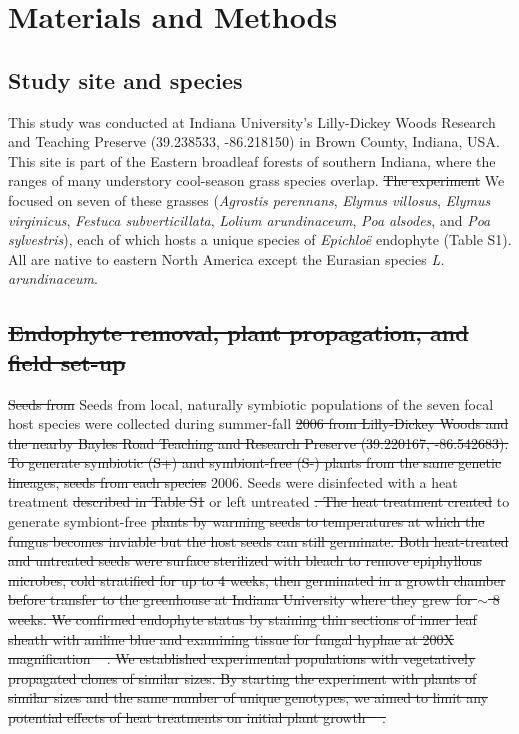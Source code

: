 \documentclass[lineno,sn-nature]{sn-jnl}%
\providecommand{\DIFadd}[1]{{\protect\color{blue}#1}} %
\providecommand{\DIFdel}[1]{{\protect\color{red}\protect\scriptsize\sout{#1}}}
\providecommand{\DIFadd}[1]{{\protect\color{blue}\uwave{#1}}} %
\providecommand{\DIFdel}[1]{{\protect\color{red}\sout{#1}}}                      %
\providecommand{\DIFaddbegin}{} %
\providecommand{\DIFaddend}{} %
\providecommand{\DIFdelbegin}{} %
\providecommand{\DIFdelend}{} %
\newcommand{\DIFscaledelfig}{0.5}
\newlength{\DIFdelgraphicswidth} %
\newlength{\DIFdelgraphicsheight} %
\newcommand{\DIFaddincludegraphics}[2][]{{\color{blue}\fbox{\DIFOincludegraphics[#1]{#2}}}} %
\newcommand{\DIFdelincludegraphics}[2][]{%
\sbox{\DIFdelgraphicsbox}{\DIFOincludegraphics[#1]{#2}}%
\settoboxwidth{\DIFdelgraphicswidth}{\DIFdelgraphicsbox} %
\settoboxtotalheight{\DIFdelgraphicsheight}{\DIFdelgraphicsbox} %
\scalebox{\DIFscaledelfig}{%
\parbox[b]{\DIFdelgraphicswidth}{\usebox{\DIFdelgraphicsbox}\\[-\baselineskip] \rule{\DIFdelgraphicswidth}{0em}}\llap{\resizebox{\DIFdelgraphicswidth}{\DIFdelgraphicsheight}{%
\setlength{\unitlength}{\DIFdelgraphicswidth}%
\begin{picture}(1,1)%
\thicklines\linethickness{2pt} %
{\color[rgb]{1,0,0}\put(0,0){\framebox(1,1){}}}%
{\color[rgb]{1,0,0}\put(0,0){\line( 1,1){1}}}%
{\color[rgb]{1,0,0}\put(0,1){\line(1,-1){1}}}%
\end{picture}%
}\hspace*{3pt}}} %
} %
\DeclareRobustCommand{\DIFaddbegin}{\DIFOaddbegin \let\includegraphics\DIFaddincludegraphics} %
\DeclareRobustCommand{\DIFaddend}{\DIFOaddend \let\includegraphics\DIFOincludegraphics} %
\DeclareRobustCommand{\DIFdelbegin}{\DIFOdelbegin \let\includegraphics\DIFdelincludegraphics} %
\DeclareRobustCommand{\DIFdelend}{\DIFOaddend \let\includegraphics\DIFOincludegraphics} %
\begin{document}
\section*{Materials and Methods}
	\subsection*{Study site and species}
	This study was conducted at Indiana University's Lilly-Dickey Woods Research and Teaching Preserve (39.238533, -86.218150) in Brown County, Indiana, USA. 
	This site is part of the Eastern broadleaf forests of southern Indiana, where the ranges of many understory cool-season grass species overlap. 
	\DIFdelbegin \DIFdel{The experiment }\DIFdelend \DIFaddbegin \DIFadd{We }\DIFaddend focused on seven of these grasses (\emph{Agrostis perennans}, \emph{Elymus villosus}, \emph{Elymus virginicus}, \emph{Festuca subverticillata}, \emph{Lolium arundinaceum}, \emph{Poa alsodes}, and \emph{Poa sylvestris}), each of which hosts a unique species of \emph{Epichlo\"e} endophyte (Table S1). 
	All are native to eastern North America except the Eurasian species \emph{L. arundinaceum}.

	\DIFdelbegin \subsection*{\DIFdel{Endophyte removal, plant propagation, and field set-up}}
\DIFdel{Seeds from }\DIFdelend \DIFaddbegin \DIFadd{Seeds from local, }\DIFaddend naturally symbiotic populations of the seven focal host species were collected during summer-fall \DIFdelbegin \DIFdel{2006 from Lilly-Dickey Woods and the nearby Bayles Road Teaching and Research Preserve (39.220167, -86.542683). 
	To generate symbiotic (S+) and symbiont-free (S-) plants from the same genetic lineages, seeds from each species }\DIFdelend \DIFaddbegin \DIFadd{2006. 
	Seeds }\DIFaddend were disinfected with a heat treatment \DIFdelbegin \DIFdel{described in Table S1 }\DIFdelend or left untreated \DIFdelbegin \DIFdel{. 
	The heat treatment created }\DIFdelend \DIFaddbegin \DIFadd{to generate }\DIFaddend symbiont-free \DIFdelbegin \DIFdel{plants by warming seeds to temperatures at which the fungus becomes inviable but the host seeds can still germinate.
	Both heat-treated and untreated seeds were surface sterilized with bleach to remove epiphyllous microbes, cold stratified for up to 4 weeks, then germinated in a growth chamber before transfer to the greenhouse at Indiana University where they grew for $\sim$ 8 weeks. 
	We confirmed endophyte status by staining thin sections of inner leaf sheath with aniline blue and examining tissue for fungal hyphae at 200X magnification \mbox{%
\cite{bacon2018stains}}\hspace{0pt}%
. 
	We established experimental populations with vegetatively propagated clones of similar sizes. 
	By starting the experiment with plants of similar sizes and the same number of unique genotypes, we aimed to limit any potential effects of heat treatments on initial plant growth \mbox{%
\cite{rudgers2009benefits}}\hspace{0pt}%
.
	}%
\end{document}
